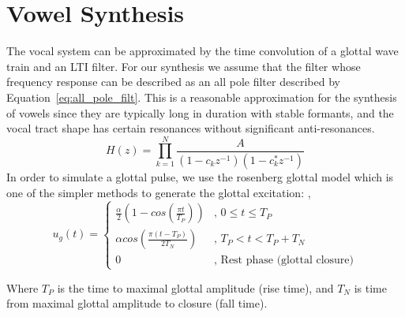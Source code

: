 \documentclass{article}
\begin{document}
\section{Vowel Synthesis} %
\label{sec:vowel_synthesis}
The vocal system can be approximated by the time convolution of a glottal wave train and an LTI filter. For our synthesis we assume that the filter whose frequency response can be described as an all pole filter described by Equation~\eqref{eq:all_pole_filt}. This is a reasonable approximation for the synthesis of vowels since they are typically long in duration with stable formants, and the vocal tract shape has certain resonances without significant anti-resonances. 
\begin{equation}\label{eq:all_pole_filt}
	H(z) = \prod\limits_{k=1}^{N}\frac{A}{(1-c_kz^{-1})(1-c_k^*z^{-1})}
\end{equation}
In order to simulate a glottal pulse, we use the rosenberg glottal model which is one of the simpler methods to generate the glottal excitation: \cite{shue2010interdependencies},~\cite{rosenberg_glottal}
\[
u_g(t) = 
\begin{cases}
	\frac{\alpha}{2}(1-cos(\frac{\pi t}{T_P})) &\text{, } 0 \leq t \leq T_P\\
	\alpha cos(\frac{\pi(t - T_P)}{2T_N}) &\text{, } T_P < t < T_P + T_N\\
	0 &\text{, Rest phase (glottal closure)}
\end{cases}
\]

Where $T_P$ is the time to maximal glottal amplitude (rise time), and $T_N$ is time from maximal glottal amplitude to closure (fall time). 
\end{document}
